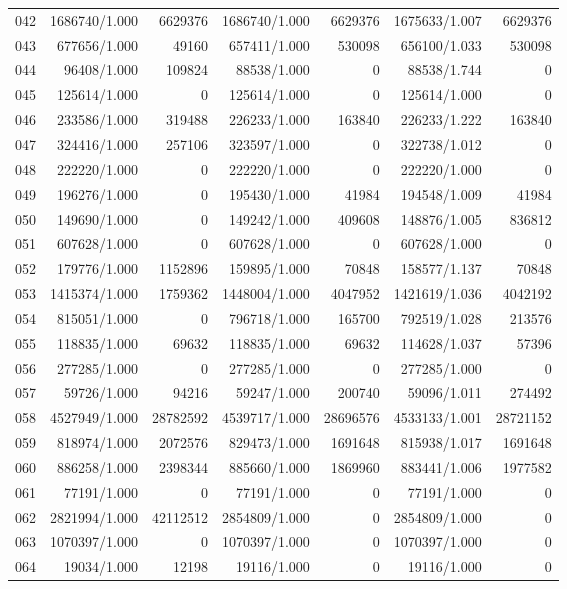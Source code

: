 \begin{longtable}{crrrrrr}
042 & 1686740/1.000 & 6629376 & 1686740/1.000 & 6629376 & 1675633/1.007 & 6629376 \\
043 & 677656/1.000 & 49160 & 657411/1.000 & 530098 & 656100/1.033 & 530098 \\
044 & 96408/1.000 & 109824 & 88538/1.000 & 0 & 88538/1.744 & 0 \\
045 & 125614/1.000 & 0 & 125614/1.000 & 0 & 125614/1.000 & 0 \\
046 & 233586/1.000 & 319488 & 226233/1.000 & 163840 & 226233/1.222 & 163840 \\
047 & 324416/1.000 & 257106 & 323597/1.000 & 0 & 322738/1.012 & 0 \\
048 & 222220/1.000 & 0 & 222220/1.000 & 0 & 222220/1.000 & 0 \\
049 & 196276/1.000 & 0 & 195430/1.000 & 41984 & 194548/1.009 & 41984 \\
050 & 149690/1.000 & 0 & 149242/1.000 & 409608 & 148876/1.005 & 836812 \\
051 & 607628/1.000 & 0 & 607628/1.000 & 0 & 607628/1.000 & 0 \\
052 & 179776/1.000 & 1152896 & 159895/1.000 & 70848 & 158577/1.137 & 70848 \\
053 & 1415374/1.000 & 1759362 & 1448004/1.000 & 4047952 & 1421619/1.036 & 4042192 \\
054 & 815051/1.000 & 0 & 796718/1.000 & 165700 & 792519/1.028 & 213576 \\
055 & 118835/1.000 & 69632 & 118835/1.000 & 69632 & 114628/1.037 & 57396 \\
056 & 277285/1.000 & 0 & 277285/1.000 & 0 & 277285/1.000 & 0 \\
057 & 59726/1.000 & 94216 & 59247/1.000 & 200740 & 59096/1.011 & 274492 \\
058 & 4527949/1.000 & 28782592 & 4539717/1.000 & 28696576 & 4533133/1.001 & 28721152 \\
059 & 818974/1.000 & 2072576 & 829473/1.000 & 1691648 & 815938/1.017 & 1691648 \\
060 & 886258/1.000 & 2398344 & 885660/1.000 & 1869960 & 883441/1.006 & 1977582 \\
061 & 77191/1.000 & 0 & 77191/1.000 & 0 & 77191/1.000 & 0 \\
062 & 2821994/1.000 & 42112512 & 2854809/1.000 & 0 & 2854809/1.000 & 0 \\
063 & 1070397/1.000 & 0 & 1070397/1.000 & 0 & 1070397/1.000 & 0 \\
064 & 19034/1.000 & 12198 & 19116/1.000 & 0 & 19116/1.000 & 0 \\

\end{longtable}
